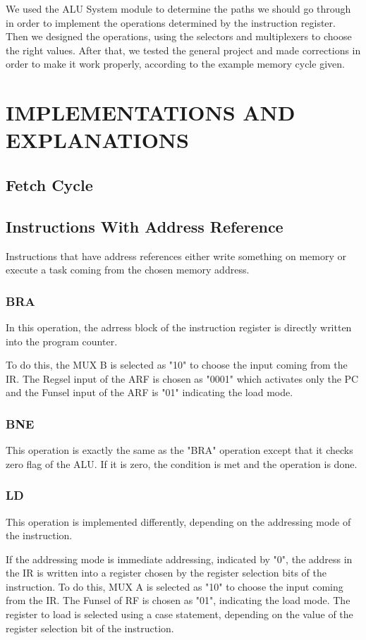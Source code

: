 \documentclass[pdftex,12pt,a4paper]{article}
\begin{document}
We used the ALU System module to determine the paths we should go through in order to implement the operations 
determined by the instruction register. Then we designed the operations, using the selectors and multiplexers to choose
the right values. After that, we tested the general project and made corrections in order to make it work properly, 
according to the example memory cycle given.

\section{IMPLEMENTATIONS AND EXPLANATIONS }
\subsection{Fetch Cycle}

\subsection{Instructions With Address Reference}
Instructions that have address references either write something on memory or execute a task coming from the chosen 
memory address. 

\subsubsection{BRA}
In this operation, the adrress block of the instruction register is directly written into the program counter.

To do this, the MUX B is selected as "10" to choose the input coming from the IR. The Regsel 
input of the ARF is chosen as "0001" which activates only the PC and the Funsel input of the ARF is "01" indicating
the load mode.

\subsubsection{BNE}
This operation is exactly the same as the "BRA" operation except that it checks zero flag of the ALU. If it is zero,
the condition is met and the operation is done.

\subsubsection{LD}
This operation is implemented differently, depending on the addressing mode of the instruction.

If the addressing mode is immediate addressing, indicated by "0", the address in the IR is written into a register
chosen by the register selection bits of the instruction. To do this, MUX A is selected as "10" to choose the input 
coming from the IR. The Funsel of RF is chosen as "01", indicating the load mode. The register to load is selected 
using a case statement, depending on the value of the register selection bit of the instruction.
\end{document}
